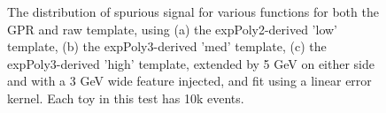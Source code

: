 \begin{figure} 
\begin{center}

\caption{The distribution of spurious signal for various functions for both the GPR and raw template, using (a) the expPoly2-derived 'low' template, (b) the expPoly3-derived 'med' template, (c) the expPoly3-derived 'high' template, extended by 5 GeV on either side and with a 3 GeV wide feature injected, and fit using a linear error kernel. Each toy in this test has 10k events.}
\label{fig:linearkernel_lowpt_10k_Sig}
\end{center}
\end{figure}

